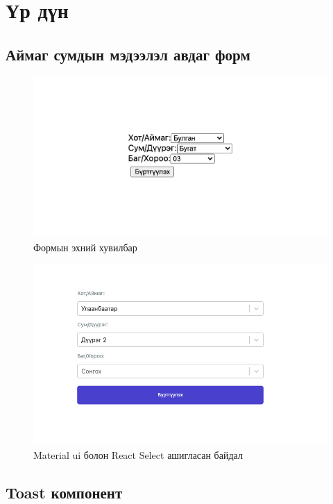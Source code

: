 \section{Үр дүн}
\subsection{Аймаг сумдын мэдээлэл авдаг форм}

\begin{figure}
	\centering
	\includegraphics[width=15cm]{images/form-v1.png}
	\caption{Формын эхний хувилбар}
	\label{fig:form-v1}
\end{figure}

\begin{figure}
	\centering
	\includegraphics[width=15cm]{images/form.png}
	\caption{Material ui болон React Select ашигласан байдал}
	\label{fig:form-v2}
\end{figure}
\pagebreak

\subsection{Toast компонент}

